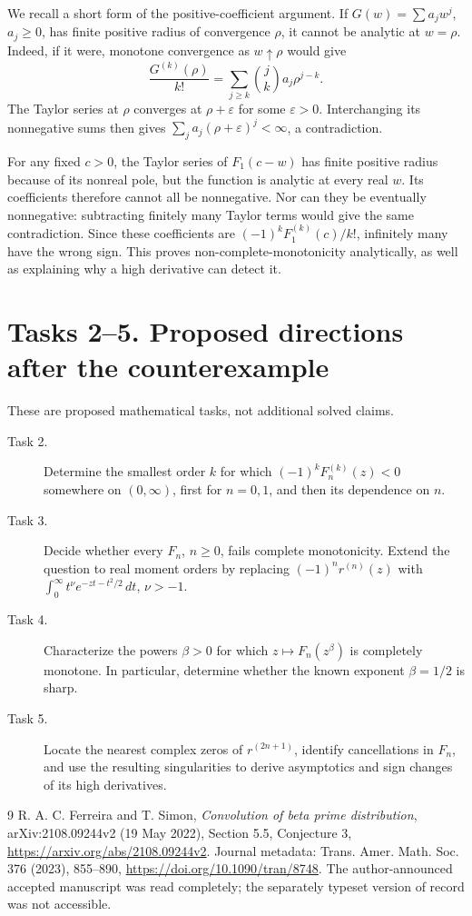 \documentclass[11pt]{article}
\begin{document}
We recall a short form of the positive-coefficient argument.
If \(G(w)=\sum a_jw^j\), \(a_j\geq0\), has finite positive
radius of convergence \(\rho\), it cannot be analytic at \(w=\rho\).
Indeed, if it were, monotone convergence as \(w\uparrow\rho\) would give
\[
 \frac{G^{(k)}(\rho)}{k!}
 =\sum_{j\geq k}\binom jk a_j\rho^{j-k}.
\]
The Taylor series at \(\rho\) converges at \(\rho+\varepsilon\)
for some \(\varepsilon>0\). Interchanging its nonnegative sums then
gives \(\sum_j a_j(\rho+\varepsilon)^j<\infty\), a contradiction.

For any fixed \(c>0\), the Taylor series of \(F_1(c-w)\) has finite
positive radius because of its nonreal pole, but the function is
analytic at every real \(w\). Its coefficients therefore cannot all
be nonnegative. Nor can they be eventually nonnegative: subtracting
finitely many Taylor terms would give the same contradiction.
Since these coefficients are \((-1)^kF_1^{(k)}(c)/k!\), infinitely
many have the wrong sign. This proves non-complete-monotonicity
analytically, as well as explaining why a high derivative can detect it.

\section*{Tasks 2--5. Proposed directions after the counterexample}
These are proposed mathematical tasks, not additional solved claims.
\begin{description}
\item[Task 2.] Determine the smallest order \(k\) for which
\((-1)^kF_n^{(k)}(z)<0\) somewhere on \((0,\infty)\), first for
\(n=0,1\), and then its dependence on \(n\).
\item[Task 3.] Decide whether every \(F_n\), \(n\geq0\), fails complete
monotonicity. Extend the question to real moment orders by replacing
\((-1)^nr^{(n)}(z)\) with
\(\int_0^\infty t^\nu e^{-zt-t^2/2}\,dt\), \(\nu>-1\).
\item[Task 4.] Characterize the powers \(\beta>0\) for which
\(z\mapsto F_n(z^\beta)\) is completely monotone. In particular,
determine whether the known exponent \(\beta=1/2\) is sharp.
\item[Task 5.] Locate the nearest complex zeros of \(r^{(2n+1)}\),
identify cancellations in \(F_n\), and use the resulting singularities
to derive asymptotics and sign changes of its high derivatives.
\end{description}

\begin{thebibliography}{9}
 R. A. C. Ferreira and T. Simon,
\emph{Convolution of beta prime distribution},
arXiv:2108.09244v2 (19 May 2022), Section 5.5, Conjecture 3,
\url{https://arxiv.org/abs/2108.09244v2}.
Journal metadata: Trans. Amer. Math. Soc. 376 (2023), 855--890,
\url{https://doi.org/10.1090/tran/8748}.
The author-announced accepted manuscript was read completely;
the separately typeset version of record was not accessible.
\end{thebibliography}
\end{document}

